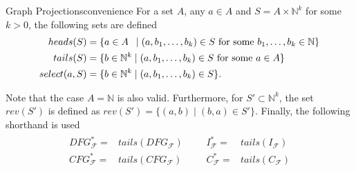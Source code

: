 \begin{notation}{Graph Projections}{convenience}
    For a set $A$, any $a\in A$ and $S=A\times\mathbb N^k$ for some $k>0$, the
    following sets are defined
    \begin{align*}
        heads(S)={}&\{a\in A\hspace{1.8mm}\mid(a,b_1,\dots,b_k)\in S\text{ for some }b_1,\dots,b_k\in\mathbb N\}\\
        tails(S)={}&\{b\in\mathbb N^k\mid(a,b_1,\dots,b_k)\in S\text{ for some }a\in A\}\\
        select(a,S)={}&\{b\in\mathbb N^k\mid(a,b_1,\dots,b_k)\in S\}.
    \end{align*}

    Note that the case $A=\mathbb N$ is also valid.
    Furthermore, for $S'\subset\mathbb N^k$, the set $rev(S')$ is defined as
    $rev(S')=\{(a,b)\mid(b,a)\in S'\}$.
    Finally, the following shorthand is used
    \begin{align*}
        \begin{aligned}
        DFG_\mathcal F^*={}&tails(DFG_\mathcal F)\\
        CFG_\mathcal F^*={}&tails(CFG_\mathcal F)
        \end{aligned}&&
        \begin{aligned}
        I_\mathcal F^*={}&tails(I_\mathcal F)\\
        C_\mathcal F^*={}&tails(C_\mathcal F)
        \end{aligned}
    \end{align*}
\end{notation}